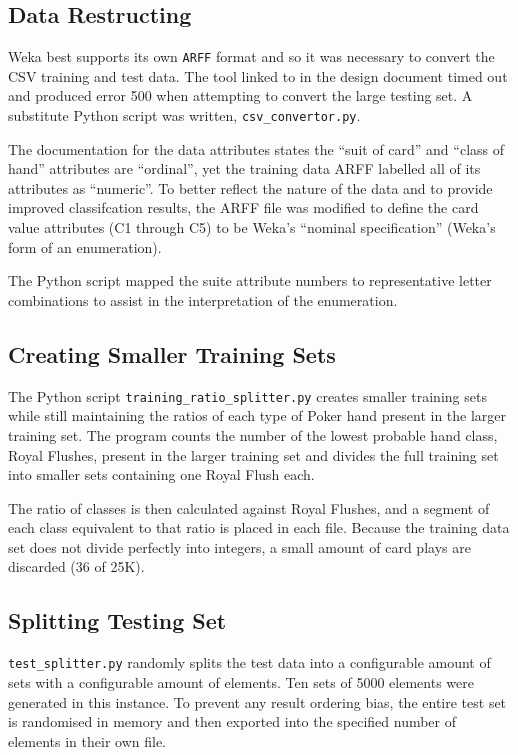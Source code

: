 \documentclass[11pt, a4paper]{article}
\begin{document}
\subsection*{Data Restructing}

Weka best supports its own \texttt{ARFF} format and so it was necessary to convert the CSV training \cite{trainingdata} and test \cite{testdata} data. The tool linked to in the design document \cite{arffconv} timed out and produced error 500 when attempting to convert the large testing set. A substitute Python script was written, \texttt{csv\_convertor.py}.

The documentation for the data attributes \cite{expattr} states the ``suit of card'' and ``class of hand'' attributes are ``ordinal'', yet the training data ARFF labelled all of its attributes as ``numeric''. To better reflect the nature of the data and to provide improved classifcation results, the ARFF file was modified to define the card value attributes (C1 through C5) to be Weka's ``nominal specification'' (Weka's form of an enumeration). 

The Python script mapped the suite attribute numbers to representative letter combinations to assist in the interpretation of the enumeration.

\subsection*{Creating Smaller Training Sets}

The Python script \texttt{training\_ratio\_splitter.py} creates smaller training sets while still maintaining the ratios of each type of Poker hand present in the larger training set. The program counts the number of the lowest probable hand class, Royal Flushes,  present in the larger training set and divides the full training set into smaller sets containing one Royal Flush each.

The ratio of classes is then calculated against Royal Flushes, and a segment of each class equivalent to that ratio is placed in each file. Because the training data set does not divide perfectly into integers, a small amount of card plays are discarded (36 of 25K). 

\subsection*{Splitting Testing Set}

\texttt{test\_splitter.py} randomly splits the test data into a configurable amount of sets with a configurable amount of elements. Ten sets of 5000 elements were generated in this instance. To prevent any result ordering bias, the entire test set is randomised in memory and then exported into the specified number of elements in their own file.
\end{document}
